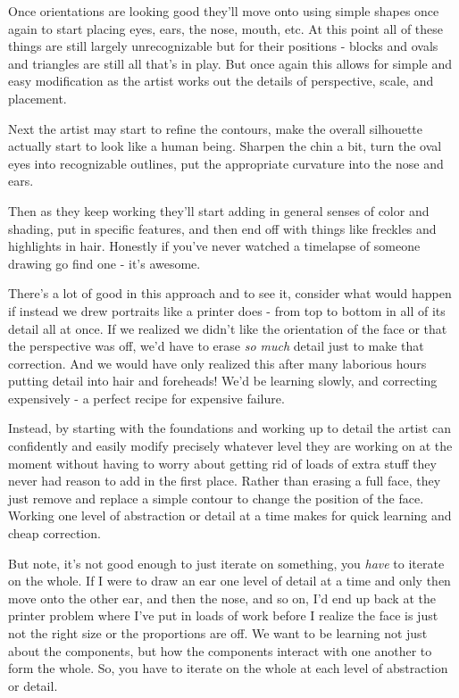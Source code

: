 \documentclass[11pt]{book}
\begin{document}
Once orientations are looking good they'll move onto using simple shapes once again to start placing eyes, ears, the nose, mouth, etc. At this point all of these things are still largely unrecognizable but for their positions - blocks and ovals and triangles are still all that's in play. But once again this allows for simple and easy modification as the artist works out the details of perspective, scale, and placement.
\newline

Next the artist may start to refine the contours, make the overall silhouette actually start to look like a human being. Sharpen the chin a bit, turn the oval eyes into recognizable outlines, put the appropriate curvature into the nose and ears. 
\newline

Then as they keep working they'll start adding in general senses of color and shading, put in specific features, and then end off with things like freckles and highlights in hair. Honestly if you've never watched a timelapse of someone drawing go find one - it's awesome.
\newline

There's a lot of good in this approach and to see it, consider what would happen if instead we drew portraits like a printer does - from top to bottom in all of its detail all at once. If we realized we didn't like the orientation of the face or that the perspective was off, we'd have to erase \textit{so much} detail just to make that correction. And we would have only realized this after many laborious hours putting detail into hair and foreheads! We'd be learning slowly, and correcting expensively - a perfect recipe for expensive failure. 
\newline

Instead, by starting with the foundations and working up to detail the artist can confidently and easily modify precisely whatever level they are working on at the moment without having to worry about getting rid of loads of extra stuff they never had reason to add in the first place. Rather than erasing a full face, they just remove and replace a simple contour to change the position of the face. Working one level of abstraction or detail at a time makes for quick learning and cheap correction.
\newline

But note, it's not good enough to just iterate on something, you \textit{have} to iterate on the whole. If I were to draw an ear one level of detail at a time and only then move onto the other ear, and then the nose, and so on, I'd end up back at the printer problem where I've put in loads of work before I realize the face is just not the right size or the proportions are off. We want to be learning not just about the components, but how the components interact with one another to form the whole. So, you have to iterate on the whole at each level of abstraction or detail.
\newline
\end{document}
